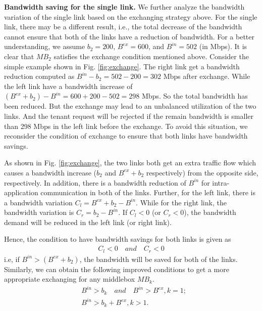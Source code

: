 \documentclass[review]{elsarticle}
\begin{document}
\textbf{Bandwidth saving for the single link.} 
We further analyze the bandwidth variation of the single link %
based on the exchanging strategy above.   
For the single link, there may be a different result, i.e., the total decrease of the bandwidth cannot ensure that both of the links have a reduction of bandwidth. For a better understanding, we assume $b_2 = 200$, $B^{ex} = 600$, and $B^{in} = 502$ (in Mbps). It is clear that $MB_2$ satisfies the exchange condition mentioned above. Consider the simple example shown in Fig. \ref{fig:exchange}. The right link get a bandwidth reduction computed as $B^{in}-b_2=502-200=302$ Mbps after exchange. While the left link have a bandwidth increase of $(B^{ex}+b_2)-B^{in}=600+200-502=298$ Mbps. So the total bandwidth has been reduced. But the exchange may lead to an unbalanced utilization of the two links. And the tenant request will be rejected if the remain bandwidth is smaller than 298 Mbps in the left link before the exchange. To avoid this situation, we reconsider the condition of exchange to ensure that both links have bandwidth savings. 

As shown in Fig. \ref{fig:exchange}, the two links both get an extra traffic flow which causes a bandwidth increase ($b_2$ and $B^{ex}+b_2$ respectively) from the opposite side, respectively. In addition, there is a bandwidth reduction of $B^{in}$ for intra-application communication in both of the links. Further, for the left link, there is a bandwidth variation $C_l=B^{ex}+b_2-B^{in}$. While for the right link, the bandwidth variation is $C_r=b_2-B^{in}$. If $C_l<0$ (or $C_r<0$), the bandwidth demand will be reduced in the left link (or right link). 

Hence, the condition to have bandwidth savings for both links is given as
\begin{equation}
\begin{aligned}
C_l<0\quad and \quad C_r<0 %
\end{aligned}
\end{equation}
i.e, if $B^{in}>(B^{ex}+b_2)$, the bandwidth will be saved for both of the links. Similarly, we can obtain the following improved conditions to get a more appropriate exchanging for any middlebox $MB_k$. 
\begin{equation}
\begin{aligned}
&B^{in}>b_k\quad and \quad B^{in}>B^{ex}, k=1;\\
&B^{in}>b_k+B^{ex}, k>1.
\end{aligned}
\label{equ:condition}
\end{equation}
\end{document}
